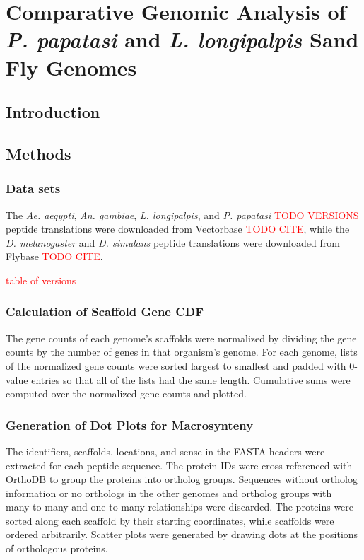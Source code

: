 \chapter{Comparative Genomic Analysis of \emph{P. papatasi} and \emph{L. longipalpis} Sand Fly Genomes}

\section{Introduction}

\section{Methods}

\subsection{Data sets}


The \emph{Ae. aegypti}, \emph{An. gambiae}, \emph{L. longipalpis}, and \emph{P. papatasi} \textcolor{red}{TODO VERSIONS} peptide translations were downloaded from Vectorbase \textcolor{red}{TODO CITE}, while the \emph{D. melanogaster} and \emph{D. simulans} peptide translations were downloaded from Flybase \textcolor{red}{TODO CITE}.

\textcolor{red}{table of versions}


\subsection{Calculation of Scaffold Gene CDF}
The gene counts of each genome's scaffolds were normalized by dividing the gene counts by the number of genes in that organism's genome. For each genome, lists of the normalized gene counts were sorted largest to smallest and padded with 0-value entries so that all of the lists had the same length.  Cumulative sums were computed over the normalized gene counts and plotted.


\subsection{Generation of Dot Plots for Macrosynteny} \label{sec:synteny-methods-dotplots}
The identifiers, scaffolds, locations, and sense in the FASTA headers were extracted for each peptide sequence.  The protein IDs were cross-referenced with OrthoDB to group the proteins into ortholog groups.  Sequences without ortholog information or no orthologs in the other genomes and ortholog groups with many-to-many and one-to-many relationships were discarded.  The proteins were sorted along each scaffold by their starting coordinates, while scaffolds were ordered arbitrarily.  Scatter plots were generated by drawing dots at the positions of orthologous proteins.

